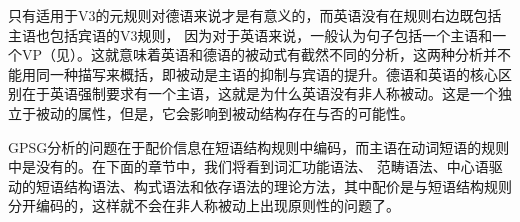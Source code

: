 只有适用于V3的元规则对德语来说才是有意义的，而英语没有在规则右边既包括主语也包括宾语的V3规则，
因为对于英语来说，一般认为句子包括一个主语和一个VP（见\citealp[]{GKPS85a}）。这就意味着英语和德语的被动式有截然不同的分析，这两种分析并不能用同一种描写来概括，即被动是主语的抑制与宾语的提升。德语和英语的核心区别在于英语强制要求有一个主语，这就是为什么英语没有非人称被动。这是一个独立于被动的属性，但是，它会影响到被动结构存在与否的可能性。

GPSG分析的问题在于配价信息在短语结构规则中编码，而主语在动词短语的规则中是没有的。在下面的章节中，我们将看到词汇功能语法\indexlfg、
范畴语法\indexcg、中心语驱动的短语结构语法\indexhpsg、构式语法\indexcxg 和依存语法\indexdg 的理论方法，其中配价是与短语结构规则分开编码的，这样就不会在非人称被动上出现原则性的问题了。

